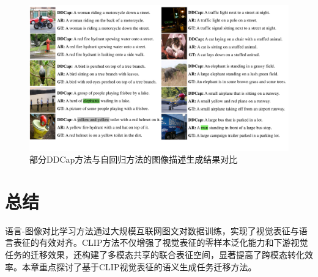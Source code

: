 \begin{figure}
  \centering
  \includegraphics[width=1.0\linewidth]{figures/ddcap-qualification.pdf}
  \caption{部分DDCap方法与自回归方法的图像描述生成结果对比}
  \label{fig:ddcap-qualification}
\end{figure}

\section{总结}
\label{sec:ddcap-summary}


语言-图像对比学习方法通过大规模互联网图文对数据训练，实现了视觉表征与语言表征的有效对齐。CLIP方法不仅增强了视觉表征的零样本泛化能力和下游视觉任务的迁移效果，还构建了多模态共享的联合表征空间，显著提高了跨模态转化效率。本章重点探讨了基于CLIP视觉表征的语义生成任务迁移方法。

